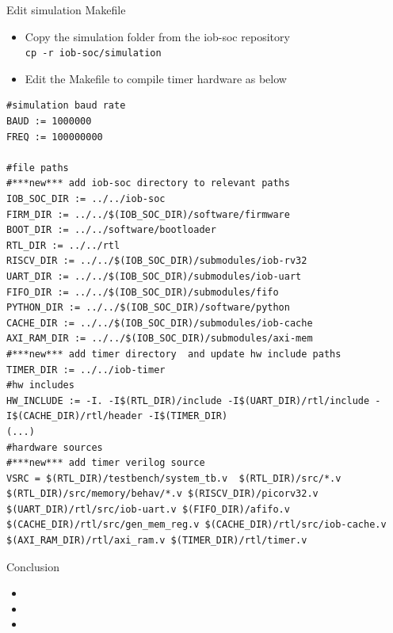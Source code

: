 \documentclass [xcolor=svgnames, t] {beamer}
\begin{document}
\begin{frame}[fragile]{Edit simulation Makefile}

\begin{itemize}
\item Copy the simulation folder from the iob-soc repository\\
  {\tt cp -r iob-soc/simulation} 
\item Edit the Makefile to compile timer hardware as below
\end{itemize}

\begin{tiny}
\begin{lstlisting}
#simulation baud rate
BAUD := 1000000
FREQ := 100000000

#file paths
#***new*** add iob-soc directory to relevant paths
IOB_SOC_DIR := ../../iob-soc
FIRM_DIR := ../../$(IOB_SOC_DIR)/software/firmware
BOOT_DIR := ../../software/bootloader
RTL_DIR := ../../rtl
RISCV_DIR := ../../$(IOB_SOC_DIR)/submodules/iob-rv32
UART_DIR := ../../$(IOB_SOC_DIR)/submodules/iob-uart
FIFO_DIR := ../../$(IOB_SOC_DIR)/submodules/fifo
PYTHON_DIR := ../../$(IOB_SOC_DIR)/software/python
CACHE_DIR := ../../$(IOB_SOC_DIR)/submodules/iob-cache
AXI_RAM_DIR := ../../$(IOB_SOC_DIR)/submodules/axi-mem
#***new*** add timer directory  and update hw include paths
TIMER_DIR := ../../iob-timer
#hw includes
HW_INCLUDE := -I. -I$(RTL_DIR)/include -I$(UART_DIR)/rtl/include -I$(CACHE_DIR)/rtl/header -I$(TIMER_DIR)
(...)
#hardware sources
#***new*** add timer verilog source 
VSRC = $(RTL_DIR)/testbench/system_tb.v  $(RTL_DIR)/src/*.v $(RTL_DIR)/src/memory/behav/*.v $(RISCV_DIR)/picorv32.v $(UART_DIR)/rtl/src/iob-uart.v $(FIFO_DIR)/afifo.v $(CACHE_DIR)/rtl/src/gen_mem_reg.v $(CACHE_DIR)/rtl/src/iob-cache.v $(AXI_RAM_DIR)/rtl/axi_ram.v $(TIMER_DIR)/rtl/timer.v
\end{lstlisting}
\end{tiny}
\end{frame}


\begin{frame}{Conclusion}
\begin{itemize}
\item 
\item 
\item 
\end{itemize}
\end{frame}




\end{document}
